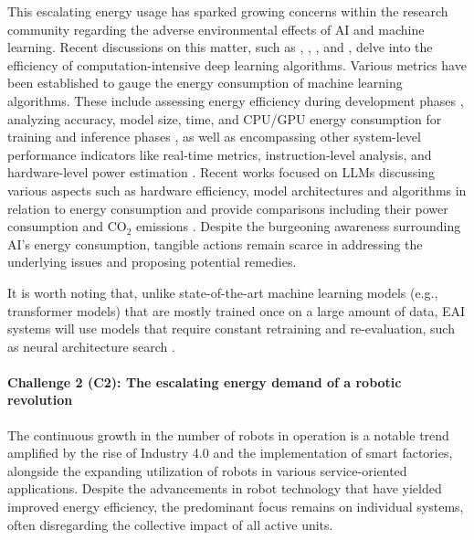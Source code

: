 \documentclass[12pt]{article}
\begin{document}
This escalating energy usage has sparked growing concerns within the research community regarding the adverse environmental effects of AI and machine learning. Recent discussions on this matter, such as \cite{schwartz2019green}, \cite{vinuesa2020role},  \cite{Strubell2019EnergyPolicyConsiderations}, and \cite{Luccioni2023EstimatingCarbonFootprint}, delve into the efficiency of computation-intensive deep learning algorithms. Various metrics have been established to gauge the energy consumption of machine learning algorithms. These include assessing energy efficiency during development phases \cite{zhou2020hulk}, analyzing accuracy, model size, time, and CPU/GPU energy consumption for training and inference phases \cite{Dalgren2019GreenMLA}, as well as encompassing other system-level performance indicators like real-time metrics, instruction-level analysis, and hardware-level power estimation \cite{garcia2019estimation}. Recent works focused on LLMs discussing various aspects such as hardware efficiency, model architectures and algorithms in relation to energy consumption \cite{Vries2023growingenergyfootprint} and provide comparisons including their power consumption and CO$_2$ emissions \cite{SIHCAI2023ArtificialIntelligenceIndex}. Despite the burgeoning awareness surrounding AI's energy consumption, tangible actions remain scarce in addressing the underlying issues and proposing potential remedies.

It is worth noting that, unlike state-of-the-art machine learning models (e.g., transformer models) that are mostly trained once on a large amount of data, EAI systems will use models that require constant retraining and re-evaluation, such as neural architecture search \cite{real2019regularized}.

\paragraph*{\textbf{Challenge 2} (C2): The escalating energy demand of a robotic revolution}\label{sec:robots_challenge}
The continuous growth in the number of robots in operation is a notable trend amplified by the rise of Industry 4.0 and the implementation of smart factories, alongside the expanding utilization of robots in various service-oriented applications. Despite the advancements in robot technology that have yielded improved energy efficiency, the predominant focus remains on individual systems, often disregarding the collective impact of all active units.
\end{document}
